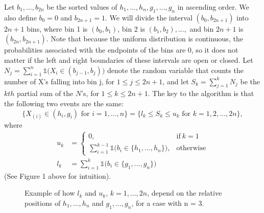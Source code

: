 \documentclass[article]{jss}
\begin{document}
Let $b_{1}, ..., b_{2n}$ be the sorted values of $h_{1}, ..., h_{n}, g_{1}, ..., g_{n}$ in ascending order. We also define $b_{0} = 0$ and $b_{2n + 1} = 1$. We will divide the interval $(b_{0}, b_{2n + 1})$ into $2n + 1$ bins, where bin 1 is $(b_{0}, b_{1})$, bin 2 is $(b_{1}, b_{2}), ...,$ and bin $2n + 1$ is $(b_{2n}, b_{2n + 1})$. Note that because the uniform distribution is continuous, the probabilities associated with the endpoints of the bins are 0, so it does not matter if the left and right boundaries of these intervals are open or closed. Let $N_{j} = \sum_{i = 1}^{n}\mathds{1}\Big(X_{i} \in (b_{j - 1}, b_{j})\Big)$ denote the random variable that counts the number of X's falling into bin j, for $1 \leq j \leq 2n+1$, and let $S_{k} =  \sum_{j=1}^{k} N_{j}$ be the $kth$ partial sum of the $N$'s, for $1 \leq k \leq 2n+1$. The key to the algorithm is that the following two events are the same:
%
\begin{equation*}
    \{X_{(i)} \in (h_{i}, g_{i}) \text{ for } i = 1, ..., n\} = \{l_{k} \leq S_{k} \leq u_{k} \textrm{ for } k = 1, 2, ..., 2n\},
\end{equation*}
%
where
%
\begin{align*}
u_{k} &=
    \begin{cases}
      0, & \text{if}\ k=1 \\
      \sum_{i = 1}^{k - 1} \mathds{1} \big(b_{i} \in \{h_{1}, ..., h_{n}\}\big), & \text{otherwise}
    \end{cases}\\
    l_{k} &=
      \sum_{i = 1}^{k} \mathds{1} \big(b_{i} \in \{g_{1}, ..., g_{n}\}\big)
\end{align*}
%
(See Figure 1 above for intuition).
\begin{figure}
\centering
{}
\caption{Example of how $l_{k}$ and $u_{k}$, $k = 1, ..., 2n$, depend on the relative positions of $h_{1}, ..., h_{n}$ and $g_{1}, ..., g_{n}$, for a case with n = 3. }
\end{figure}
\end{document}
